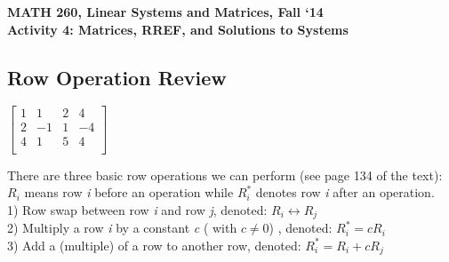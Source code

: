 \documentclass{article}
\begin{document}
\begin{flushleft}
	\bfseries{MATH 260, Linear Systems and Matrices, Fall `14}\\
	\bfseries{Activity 4:  Matrices, RREF, and Solutions to Systems}\\
\end{flushleft}
\begin{flushleft}

\section*{Row Operation Review}

\begin{center}
$\left[\begin{array}{rrr|r}
1 & 1 & 2 & 4\\
2 & -1 & 1 & -4\\
4 & 1 & 5 & 4\\
\end{array}\right]
$\\
\end{center}

There are three basic row operations we can perform (see page 134 of the text):\\
$R_i$ means row \textit{i} before an operation while $R_i^*$ denotes row \textit{i} after an operation.\\
1) Row swap between row \textit{i} and row \textit{j}, denoted: $R_i \leftrightarrow R_j$\\
2) Multiply a row \textit{i} by a constant \textit{c} ( with $c\neq 0$) , denoted: $R_i^*=c R_i$\\
3) Add a (multiple) of a row to another row, denoted: $R_i^*= R_i+c R_j$\\
\hrulefill \\


\end{flushleft}
\end{document}
